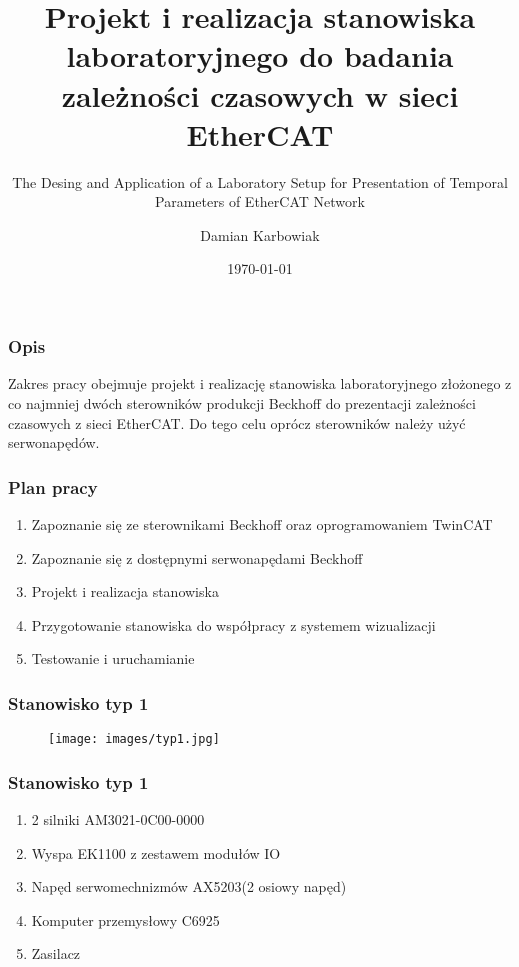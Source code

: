 \documentclass[ucs]{beamer}
\title[Zależności czasowe w sieci EtherCAT]{Projekt i realizacja stanowiska laboratoryjnego do badania zależności czasowych w sieci EtherCAT}
\subtitle{The Desing and Application of a Laboratory Setup for Presentation of Temporal Parameters of EtherCAT Network}
\author{Damian Karbowiak}
\institute{Promotor: dr inż. Jacek Stój}
\date{\today}
\begin{document}
\begin{frame}
  \titlepage
\end{frame}

\begin{frame}
\frametitle{Opis}
Zakres pracy obejmuje projekt i realizację stanowiska laboratoryjnego złożonego z co najmniej dwóch sterowników produkcji Beckhoff do prezentacji zależności czasowych z sieci EtherCAT. Do tego celu oprócz sterowników należy użyć serwonapędów.
\end{frame}

\begin{frame}
\frametitle{Plan pracy}
\begin{enumerate}
    \item Zapoznanie się ze sterownikami Beckhoff oraz oprogramowaniem TwinCAT
    \item Zapoznanie się z dostępnymi serwonapędami Beckhoff
    \item Projekt i realizacja stanowiska
    \item Przygotowanie stanowiska do współpracy z systemem wizualizacji
    \item Testowanie i uruchamianie
\end{enumerate}
\end{frame}

\begin{frame}
\frametitle{Stanowisko typ 1}
\begin{figure}[!htb]	
\centering 	          
\texttt{[image: images/typ1.jpg]}
\end{figure}
\end{frame}

\begin{frame}
\frametitle{Stanowisko typ 1}
\begin{enumerate}
    \item 2 silniki AM3021-0C00-0000
    \item Wyspa EK1100 z zestawem modułów IO
    \item Napęd serwomechnizmów AX5203(2 osiowy napęd)
    \item Komputer przemysłowy C6925
    \item Zasilacz
\end{enumerate}
\end{frame}
\end{document}
